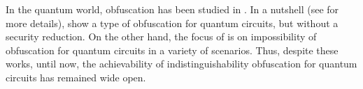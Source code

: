In the quantum world, obfuscation has been studied in \cite{AJJ14,AF16arxiv}. In a nutshell (see  for more details), \cite{AJJ14} show a type of obfuscation for quantum circuits, but without a security reduction.  On the other hand,  the focus of \cite{AF16arxiv} is on impossibility of obfuscation for quantum circuits in a variety of scenarios. Thus, despite these works, until now, the achievability of indistinguishability obfuscation for quantum circuits has remained wide open.






